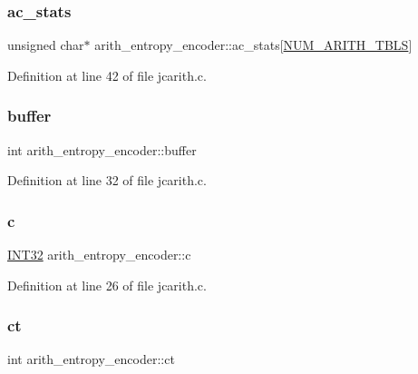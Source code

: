 \subsubsection{\texorpdfstring{ac\_stats}{ac\_stats}}
{\footnotesize\ttfamily unsigned char$\ast$ arith\+\_\+entropy\+\_\+encoder\+::ac\+\_\+stats\mbox{[}\mbox{\hyperlink{jpeglib_8h_a4efb0fccc8d9db72ca18f32a26fad6ab}{N\+U\+M\+\_\+\+A\+R\+I\+T\+H\+\_\+\+T\+B\+LS}}\mbox{]}}



Definition at line 42 of file jcarith.\+c.

\mbox{\label{structarith__entropy__encoder_a404b730ace823b7212e4953146d02159}} 
\subsubsection{\texorpdfstring{buffer}{buffer}}
{\footnotesize\ttfamily int arith\+\_\+entropy\+\_\+encoder\+::buffer}



Definition at line 32 of file jcarith.\+c.

\mbox{\label{structarith__entropy__encoder_a84198956e6633b09fda5713b89164292}} 
\subsubsection{\texorpdfstring{c}{c}}
{\footnotesize\ttfamily \mbox{\hyperlink{jmorecfg_8h_a0cb58e7e6f0bad369840a52e54a56ae0}{I\+N\+T32}} arith\+\_\+entropy\+\_\+encoder\+::c}



Definition at line 26 of file jcarith.\+c.

\mbox{\label{structarith__entropy__encoder_af636dab56c69b209b0bb5aefba723e80}} 
\subsubsection{\texorpdfstring{ct}{ct}}
{\footnotesize\ttfamily int arith\+\_\+entropy\+\_\+encoder\+::ct}



